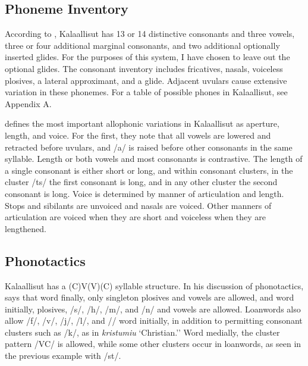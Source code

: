 \documentclass[12pt]{article}
\begin{document}
	\subsection{Phoneme Inventory}

	According to \citet{grammar}, Kalaallisut has 13 or 14 distinctive consonants and three vowels, three or four additional marginal consonants, and two additional optionally inserted glides. For the purposes of this system, I have chosen to leave out the optional glides. The consonant inventory includes fricatives, nasals, voiceless plosives, a lateral approximant, and a glide. Adjacent uvulars cause extensive variation in these phonemes. For a table of possible phones in Kalaallisut, see Appendix A. \par

	\citet{quan} defines the most important allophonic variations in Kalaallisut as aperture, length, and voice. For the first, they note that all vowels are lowered and retracted before uvulars, and /a/ is raised before other consonants in the same syllable. Length or both vowels and most consonants is contrastive. The length of a single consonant is either short or long, and within consonant clusters, in the cluster /ts/ the first consonant is long, and in any other cluster the second consonant is long. Voice is determined by manner of articulation and length. Stops and sibilants are unvoiced and nasals are voiced. Other manners of articulation are voiced when they are short and voiceless when they are lengthened. \par

	\subsection{Phonotactics}

	Kalaallisut has a (C)V(V)(C) syllable structure. In his discussion of phonotactics, \citet{grammar} says that word finally, only singleton plosives and vowels are allowed, and word initially, plosives, /s/, /h/, /m/, and /n/ and vowels are allowed. Loanwords also allow /f/, /v/, /j/, /l/, and /\textinvscr/ word initially, in addition to permitting consonant clusters such as /k\textinvscr/, as in \textit{kristumiu} `Christian.'' Word medially, the cluster pattern /V\textinvscr C/ is allowed, while some other clusters occur in loanwords, as seen in the previous example with /st/. \par
\end{document}
